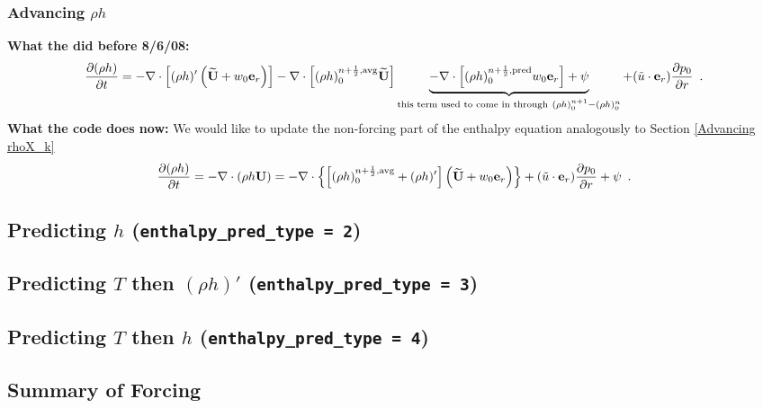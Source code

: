 \subsubsection{Advancing $\rho h$}
{\bf What the did before 8/6/08:}
\begin{equation}
\frac{\partial(\rho h)}{\partial t} = -\nabla\cdot\left[(\rho h)'\left(\widetilde{{\bf U}} 
+ w_0{\bf e}_r\right)\right] - \nabla\cdot\left[(\rho h)_0^{n+\frac{1}{2},{\rm avg}}\widetilde{{\bf U}}\right] 
\underbrace{- \nabla\cdot\left[(\rho h)_0^{n+\frac{1}{2},{\rm pred}}w_0{\bf e}_r\right] + \psi}_{\text{this term used to come in through} ~ (\rho h)_0^{n+1} - (\rho h)_0^n} + (\tilde{u} \cdot \mathbf{e}_r)\frac{\partial p_0}{\partial r} \enskip .
\end{equation}
{\bf What the code does now:} We would like to update the 
non-forcing part of the enthalpy equation analogously to Section \ref{Advancing rhoX_k}
\begin{equation}
\frac{\partial(\rho h)}{\partial t} = -\nabla\cdot(\rho h{\bf U}) = 
-\nabla\cdot\left\{\left[(\rho h)_0^{n+\frac{1}{2},{\rm avg}} 
+ (\rho h)'\right]\left(\widetilde{{\bf U}} + w_0{\bf e}_r\right)\right\} + (\tilde{u} \cdot \mathbf{e}_r)\frac{\partial p_0}{\partial r} + \psi  \enskip .
\end{equation}


\subsection{Predicting $h$ ({\tt enthalpy\_pred\_type = 2})}

\subsection{Predicting $T$ then $(\rho h)'$ ({\tt enthalpy\_pred\_type = 3})}

\subsection{Predicting $T$ then $h$ ({\tt enthalpy\_pred\_type = 4})}

\subsection{Summary of Forcing}

